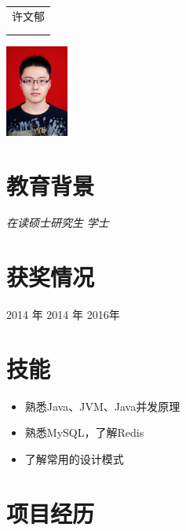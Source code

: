 \documentclass{resume}
\begin{document}

\medskip\noindent
\begin{minipage}{0.7\textwidth}
  \Large{
    \begin{tabu}  { l }
      \scshape{许文郁} \\
       \\
       \\
    \end{tabu}
  }
\end{minipage}
\begin{minipage}{0.3\textwidth}
  \raggedleft
  \includegraphics[height=30mm]{me}
\end{minipage}

\section{教育背景}
\textit{在读硕士研究生}
\textit{学士}

\section{获奖情况}
 {2014 年}
 {2014 年}
 {2016年}

\section{技能}
\begin{itemize}[parsep=0.5ex]
  \item 熟悉Java、JVM、Java并发原理
  \item 熟悉MySQL，了解Redis
  \item 了解常用的设计模式
\end{itemize}

\section{项目经历}
\end{document}
